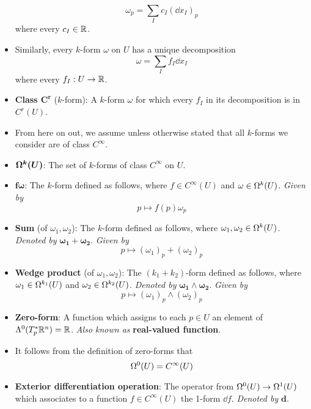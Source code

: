 \documentclass[../notes.tex]{subfiles}
\begin{document}
\begin{itemize}
    \begin{equation*}
        \omega_p = \sum_Ic_I(\dd x_I)_p
    \end{equation*}
    where every $c_I\in\R$.
    \item Similarly, every $k$-form $\omega$ on $U$ has a unique decomposition
    \begin{equation*}
        \omega = \sum_If_I\dd{x_I}
    \end{equation*}
    where every $f_I:U\to\R$.
    \item \textbf{Class $\bm{C^r}$} ($k$-form): A $k$-form $\omega$ for which every $f_I$ in its decomposition is in $C^r(U)$.
    \item From here on out, we assume unless otherwise stated that all $k$-forms we consider are of class $C^\infty$.
    \item $\bm{\ome[k]{U}}$: The set of $k$-forms of class $C^\infty$ on $U$.
    \item $\bm{f\omega}$: The $k$-form defined as follows, where $f\in C^\infty(U)$ and $\omega\in\ome[k]{U}$. \emph{Given by}
    \begin{equation*}
        p \mapsto f(p)\omega_p
    \end{equation*}
    \item \textbf{Sum} (of $\omega_1,\omega_2$): The $k$-form defined as follows, where $\omega_1,\omega_2\in\ome[k]{U}$. \emph{Denoted by} $\bm{\omega_1+\omega_2}$. \emph{Given by}
    \begin{equation*}
        p \mapsto (\omega_1)_p+(\omega_2)_p
    \end{equation*}
    \item \textbf{Wedge product} (of $\omega_1,\omega_2$): The $(k_1+k_2)$-form defined as follows, where $\omega_1\in\ome[k_1]{U}$ and $\omega_2\in\ome[k_2]{U}$. \emph{Denoted by} $\bm{\omega_1\wedge\omega_2}$. \emph{Given by}
    \begin{equation*}
        p \mapsto (\omega_1)_p\wedge(\omega_2)_p
    \end{equation*}
    \item \textbf{Zero-form}: A function which assigns to each $p\in U$ an element of $\lam[0]{T_p^*\R^n}=\R$. \emph{Also known as} \textbf{real-valued function}.
    \item It follows from the definition of zero-forms that
    \begin{equation*}
        \ome[0]{U} = C^\infty(U)
    \end{equation*}
    \item \textbf{Exterior differentiation operation}: The operator from $\ome[0]{U}\to\ome[1]{U}$ which associates to a function $f\in C^\infty(U)$ the 1-form $\dd f$. \emph{Denoted by} $\mathbf{d}$.

\end{itemize}
\end{document}
